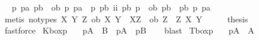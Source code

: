 \begin{isabellebody}
\ \isamarkupfalse%
\ {\isachardoublequoteopen}{\isasymforall}p\ pa\ pb{\isachardot}\ {\isacharparenleft}{\isasymnot}\ ob\ p\ pa\ {\isasymor}\ p\isactrlbold {\isasymand}\isactrlbold {\isasymnot}\ pb\ {\isacharparenleft}ii\ pb\ p{\isacharparenright}{\isacharparenright}\ {\isasymor}\ ob\ pb\ {\isacharparenleft}\isactrlbold {\isasymor}\ pb\isactrlbold {\isasymand}\isactrlbold {\isasymnot}\ p\ pa{\isacharparenright}{\isachardoublequoteclose}\isanewline
\ \ \ \ \isamarkupfalse%
\ {\isacharparenleft}metis\ {\isacharparenleft}no{\isacharunderscore}types{\isacharparenright}\ {\isacartoucheopen}{\isasymforall}X\ Y\ Z{\isachardot}\ ob\ X\ Y\ {\isasymand}\ {\isasymTurnstile}X\isactrlbold {\isasymrightarrow}Z\ {\isasymlongrightarrow}\ ob\ Z\ {\isacharparenleft}\isactrlbold {\isasymor}\ Z\isactrlbold {\isasymand}\isactrlbold {\isasymnot}\ X\ Y{\isacharparenright}{\isacartoucheclose}{\isacharparenright}\isanewline
\ \ \isamarkupfalse%
\ \isamarkupfalse%
\ {\isacharquery}thesis\isanewline
\ \ \ \ \isamarkupfalse%
\ fastforce\isanewline
{}\isamarkupfalse%
\isanewline
{}\isamarkupfalse%
\isanewline
%
%
\endisatagproof
{\isafoldproof}%
%
\isadelimproof
%
\endisadelimproof
%
\isadelimdocument
%
\endisadelimdocument
%
\isatagdocument
%
\isamarkuptrue%
%
%
\endisatagdocument
{\isafolddocument}%
%
\isadelimdocument
\isanewline
%
\endisadelimdocument
{}\isamarkupfalse%
\ K{\isacharunderscore}boxp{\isacharcolon}\isanewline
\ \ \ {\isachardoublequoteopen}{\isasymTurnstile}{\isacharparenleft}{\isacharparenleft}{\isasymbox}\isactrlsub p{\isacharparenleft}A\ \isactrlbold {\isasymrightarrow}\ B{\isacharparenright}{\isacharparenright}\ \isactrlbold {\isasymrightarrow}\ {\isacharparenleft}{\isacharparenleft}{\isasymbox}\isactrlsub pA{\isacharparenright}\ \isactrlbold {\isasymrightarrow}\ {\isacharparenleft}{\isasymbox}\isactrlsub pB{\isacharparenright}{\isacharparenright}{\isacharparenright}{\isachardoublequoteclose}\isanewline
%
\isadelimproof
\ \ %
\endisadelimproof
%
\isatagproof
{}\isamarkupfalse%
\ blast%
\endisatagproof
{\isafoldproof}%
%
\isadelimproof
\isanewline
%
\endisadelimproof
{}\isamarkupfalse%
\ T{\isacharunderscore}boxp{\isacharcolon}\isanewline
\ \ \ {\isachardoublequoteopen}{\isasymTurnstile}{\isacharparenleft}{\isacharparenleft}{\isasymbox}\isactrlsub pA{\isacharparenright}\ \isactrlbold {\isasymrightarrow}\ A{\isacharparenright}{\isachardoublequoteclose}\isanewline

\end{isabellebody}
